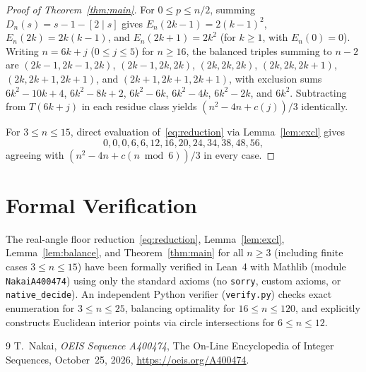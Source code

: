 \documentclass[11pt]{article}
\begin{document}
\begin{proof}[Proof of Theorem~\ref{thm:main}]
For $0 \le p \le n/2$, summing $D_n(s) = s - 1 - [2 \mid s]$ gives $E_n(2k - 1) = 2(k - 1)^2$, $E_n(2k) = 2k(k - 1)$, and $E_n(2k + 1) = 2k^2$ (for $k \ge 1$, with $E_n(0) = 0$). Writing $n = 6k + j$ ($0 \le j \le 5$) for $n \ge 16$, the balanced triples summing to $n - 2$ are $(2k-1,2k-1,2k)$, $(2k-1,2k,2k)$, $(2k,2k,2k)$, $(2k,2k,2k+1)$, $(2k,2k+1,2k+1)$, and $(2k+1,2k+1,2k+1)$, with exclusion sums $6k^2 - 10k + 4$, $6k^2 - 8k + 2$, $6k^2 - 6k$, $6k^2 - 4k$, $6k^2 - 2k$, and $6k^2$. Subtracting from $T(6k + j)$ in each residue class yields $(n^2 - 4n + c(j))/3$ identically.

For $3 \le n \le 15$, direct evaluation of~\eqref{eq:reduction} via Lemma~\ref{lem:excl} gives
\[
  0, 0, 0, 6, 6, 12, 16, 20, 24, 34, 38, 48, 56,
\]
agreeing with $(n^2 - 4n + c(n \bmod 6))/3$ in every case.
\end{proof}

\section{Formal Verification}

The real-angle floor reduction~\eqref{eq:reduction}, Lemma~\ref{lem:excl}, Lemma~\ref{lem:balance}, and Theorem~\ref{thm:main} for all $n \ge 3$ (including finite cases $3 \le n \le 15$) have been formally verified in Lean~4 with Mathlib (module \texttt{NakaiA400474}) using only the standard axioms (no \texttt{sorry}, custom axioms, or \texttt{native\_decide}). An independent Python verifier (\texttt{verify.py}) checks exact enumeration for $3 \le n \le 25$, balancing optimality for $16 \le n \le 120$, and explicitly constructs Euclidean interior points via circle intersections for $6 \le n \le 12$.

\begin{thebibliography}{9}
T.~Nakai,
\emph{OEIS Sequence A400474},
The On-Line Encyclopedia of Integer Sequences, October~25, 2026,
\url{https://oeis.org/A400474}.
\end{thebibliography}
\end{document}
